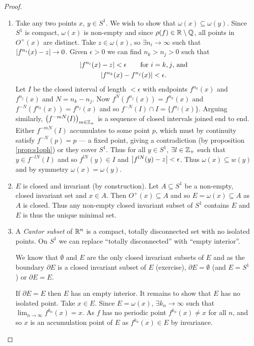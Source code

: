 \documentclass{notes}
\newcommand{\Q}{\mathbb{Q}}
\theoremstyle{plain}
\begin{document}
\begin{proof}\hfill
  \begin{enumerate}
  \item Take any two points $x$, $y \in S^1$.  We wish to show that
    $\omega(x) \subseteq \omega(y)$.  Since $S^1$ is compact, $\omega(x)$
    is non-empty and since $\rho(f) \in \R \setminus \Q$, all points
    in $O^+(x)$ are distinct.  Take $z \in \omega(x)$, so
    $\exists n_i \to \infty$ such that $\left|f^{n_i}(x) - z\right| \to 0$.  Given
    $\epsilon>0$ we can find $n_k > n_j > 0$ such that
    \begin{gather*}
    \left|f^{n_i}(x) - z\right| < \epsilon \qquad \text{for $i=k,j$, and} \\
    \left|f^{n_k}(x) - f^{n_j}(x)\right| < \epsilon.
    \end{gather*}
    Let $I$ be the closed interval of length $< \epsilon$ with endpoints
    $f^{n_k}(x)$ and $f^{n_j}(x)$ and $N = n_k - n_j$.  Now
    $f^{N}(f^{n_j}(x)) = f^{n_k}(x)$ and $f^{-N}(f^{n_k}(x)) = f^{n_j}(x)$
    and so $f^{-N}(I) \cap I = \{ f^{n_j}(x)\}$.  Arguing similarly,
    $\left(f^{-mN}(I)\right)_{m \in \mathbb{Z}_+}$ is a sequence of closed intervals
    joined end to end.  Either $f^{-mN}(I)$ accumulates to some
    point $p$, which must by continuity satisfy $f^{-N}(p) = p$ --- a 
    fixed point, giving a contradiction (by proposition \ref{prop:s1oph})
    or they cover $S^1$.  Thus for all $y \in S^1$, $\exists l \in \mathbb{Z}_+$
    such that $y \in f^{-lN}(I)$ and so $f^{lN}(y) \in I$ and
    $\left|f^{lN}(y) - z\right| < \epsilon$.  Thus $\omega(x) \subseteq w(y)$ and
    by symmetry $\omega(x) = \omega(y)$.

  \item $E$ is closed and invariant (by construction).  Let $A \subseteq S^1$
    be a non-empty, closed invariant set and $x \in A$.  Then $O^+(x)
    \subseteq A$ and so $E = \omega(x) \subseteq A$ as $A$ is closed.
    Thus any non-empty closed invariant subset of $S^1$ contains $E$ and
    $E$ is thus the unique minimal set.

  \item A \emph{Cantor subset} of $\mathbb{R}^n$ is a compact, totally disconnected
    set with no isolated points.  On $S^1$ we can replace ``totally
    disconnected'' with ``empty interior''.

    We know that $\emptyset$ and $E$ are the only closed invariant subsets
    of $E$ and as the boundary $\partial E$ is a closed invariant subset
    of $E$ (exercise), $\partial E = \emptyset$ (and
    $E = S^1$) or $\partial E = E$.

    If $\partial E = E$ then $E$ has an empty interior.  It remains
    to show that $E$ has no isolated point.  Take $x \in E$.  Since
    $E = \omega(x)$, $\exists k_n \to \infty$ such that
    $\lim_{n \to \infty} f^{k_n}(x) = x$.  As $f$ has no periodic point
    $f^{k_n}(x) \neq x$ for all $n$, and so $x$ is an accumulation point
    of $E$ as $f^{k_n}(x) \in E$ by invariance.

  \end{enumerate}
\end{proof}
\end{document}
